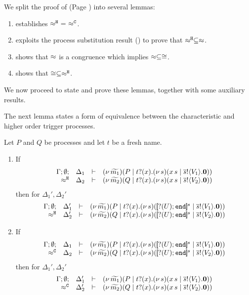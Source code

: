 \noi We split the proof of  (Page \pageref{the:coincidence}) into 
several lemmas:
\begin{enumerate}[$-$]
\item	{} establishes $\hwb\ =\ \fwb$.
\item	{} exploits the process substitution result
		() to prove that $\approx^\mathtt{H} \subseteq \approx$.
\item	{} shows that $\approx$ is a congruence
		which implies $\approx \subseteq \cong$.
\item	{} shows  that $\cong \subseteq \approx^\mathtt{H}$.
\end{enumerate}


\noi
We now proceed to state and prove these lemmas, together with some auxiliary results.

The next lemma states a form of equivalence between the characteristic
and higher order trigger processes.

\begin{lemma}
	\label{lem:trigger_equiv}
	Let $P$ and $Q$ be processes and let $t$ be a fresh name.
	\begin{enumerate}[1)]
		\item	If
				\[
					\begin{array}{rcll} \Gamma; \emptyset; &\Delta_1& \vdash& (\nu\, \widetilde{m_1})(P \;|\; t ? (x) . (\nu\, s)(x\, {s} \;|\; \overline{s} ! \langle V_1 \rangle . \mathbf{0}))\\ \approx^\mathtt{H} &\Delta_2& \vdash &  (\nu\, \widetilde{m_2})(Q \;|\; t ? (x) . (\nu\, s)(x\, {s} \;|\; \overline{s} ! \langle V_2 \rangle . \mathbf{0}) ) \end{array}
				\]
				then for $\Delta_1', \Delta_2'$
				\[
					\mhorel{\Gamma}{\Delta_1'}{\newsp{\widetilde{m_1}}{P \Par \fotrigger{t}{x}{s}{\btinp{U} \tinact}{V_1}}}
					{\hwb}
					{\Delta_2'}{}{\newsp{\widetilde{m_2}}{Q \Par \fotrigger{t}{x}{s}{\btinp{U} \tinact}{V_2}}}
				\]

		\item	If
				\[
					\mhorel{\Gamma}{\Delta_1}{\newsp{\widetilde{m_1}}{P \Par \fotrigger{t}{x}{s}{\btinp{U} \tinact}{V_1}}}
					{\fwb}
					{\Delta_2}{}{\newsp{\widetilde{m_2}}{Q \Par \fotrigger{t}{x}{s}{\btinp{U} \tinact}{V_2}}}
				\]
				then for $\Delta_1', \Delta_2'$
				\[
					\begin{array}{rcll} \Gamma; \emptyset; &\Delta_1'& \vdash& (\nu\, \widetilde{m_1})(P \;|\; t ? (x) . (\nu\, s)(x\, {s} \;|\; \overline{s} ! \langle V_1 \rangle . \mathbf{0}))\\ \approx^\mathtt{C} &\Delta_2'& \vdash &  (\nu\, \widetilde{m_2})(Q \;|\; t ? (x) . (\nu\, s)(x\, {s} \;|\; \overline{s} ! \langle V_2 \rangle . \mathbf{0}) ) \end{array}
				\]
	\end{enumerate}
\end{lemma}

